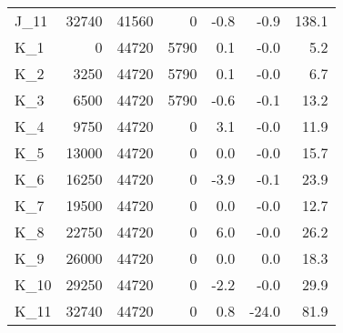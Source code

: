 \begin{tabular}{lrrrrrr}
J\_11 & 32740 & 41560 & 0 & -0.8 & -0.9 & 138.1 \\
K\_1 & 0 & 44720 & 5790 & 0.1 & -0.0 & 5.2 \\
K\_2 & 3250 & 44720 & 5790 & 0.1 & -0.0 & 6.7 \\
K\_3 & 6500 & 44720 & 5790 & -0.6 & -0.1 & 13.2 \\
K\_4 & 9750 & 44720 & 0 & 3.1 & -0.0 & 11.9 \\
K\_5 & 13000 & 44720 & 0 & 0.0 & -0.0 & 15.7 \\
K\_6 & 16250 & 44720 & 0 & -3.9 & -0.1 & 23.9 \\
K\_7 & 19500 & 44720 & 0 & 0.0 & -0.0 & 12.7 \\
K\_8 & 22750 & 44720 & 0 & 6.0 & -0.0 & 26.2 \\
K\_9 & 26000 & 44720 & 0 & 0.0 & 0.0 & 18.3 \\
K\_10 & 29250 & 44720 & 0 & -2.2 & -0.0 & 29.9 \\
K\_11 & 32740 & 44720 & 0 & 0.8 & -24.0 & 81.9 \\
\bottomrule
\end{tabular}
